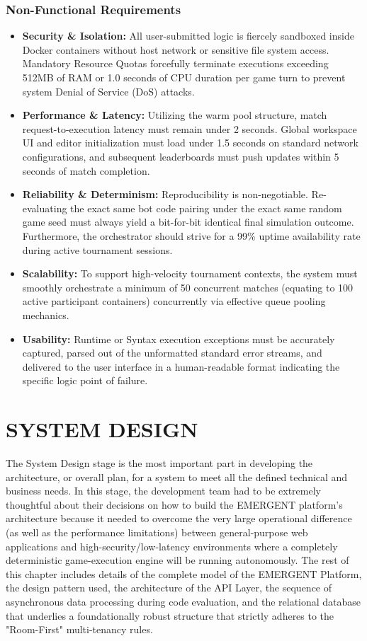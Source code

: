 \documentclass[12pt,a4paper]{report}
\begin{document}
\subsection{Non-Functional Requirements}
\begin{itemize}
    \item \textbf{Security \& Isolation:} All user-submitted logic is fiercely sandboxed inside Docker containers without host network or sensitive file system access. Mandatory Resource Quotas forcefully terminate executions exceeding 512MB of RAM or 1.0 seconds of CPU duration per game turn to prevent system Denial of Service (DoS) attacks.
    \item \textbf{Performance \& Latency:} Utilizing the warm pool structure, match request-to-execution latency must remain under 2 seconds. Global workspace UI and editor initialization must load under 1.5 seconds on standard network configurations, and subsequent leaderboards must push updates within 5 seconds of match completion.
    \item \textbf{Reliability \& Determinism:} Reproducibility is non-negotiable. Re-evaluating the exact same bot code pairing under the exact same random game seed must always yield a bit-for-bit identical final simulation outcome. Furthermore, the orchestrator should strive for a 99\% uptime availability rate during active tournament sessions.
    \item \textbf{Scalability:} To support high-velocity tournament contexts, the system must smoothly orchestrate a minimum of 50 concurrent matches (equating to 100 active participant containers) concurrently via effective queue pooling mechanics.
    \item \textbf{Usability:} Runtime or Syntax execution exceptions must be accurately captured, parsed out of the unformatted standard error streams, and delivered to the user interface in a human-readable format indicating the specific logic point of failure.
\end{itemize}

\chapter{SYSTEM DESIGN}

The System Design stage is the most important part in developing the architecture, or overall plan, for a system to meet all the defined technical and business needs. In this stage, the development team had to be extremely thoughtful about their decisions on how to build the EMERGENT platform's architecture because it needed to overcome the very large operational difference (as well as the performance limitations) between general-purpose web applications and high-security/low-latency environments where a completely deterministic game-execution engine will be running autonomously. The rest of this chapter includes details of the complete model of the EMERGENT Platform, the design pattern used, the architecture of the API Layer, the sequence of asynchronous data processing during code evaluation, and the relational database that underlies a foundationally robust structure that strictly adheres to the "Room-First" multi-tenancy rules.
\end{document}
